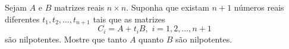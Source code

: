 Sejam \(A\) e \(B\) matrizes reais \(n\times n\). Suponha que existam \(n+1\) números reais diferentes \(t_{1},t_{2},\dots,t_{n+1}\) tais que as matrizes
\[C_{i}=A+t_{i}B, \,\,    i=1,2,\dots,n+1\]são nilpotentes. Mostre que tanto \(A\) quanto \(B\) são nilpotentes.
